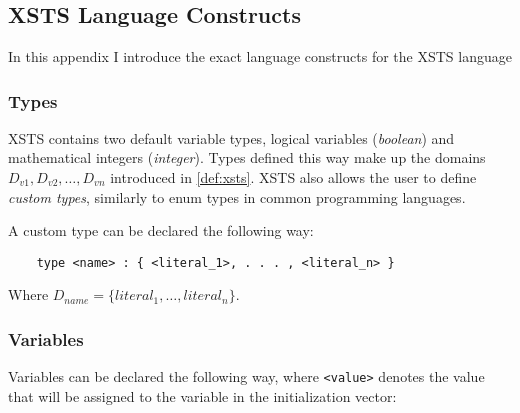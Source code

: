 \appendix
\chapter*{\fuggelek}
\setcounter{chapter}{\appendixnumber}

\section{XSTS Language Constructs}\label{sec:xsts_language}

In this appendix I introduce the exact language constructs for the XSTS language 

\subsection{Types}

XSTS contains two default variable types, logical variables (\emph{boolean}) and mathematical integers (\emph{integer}). Types defined this way make up the domains \(D_{v1}, D_{v2}, \dots, D_{vn}\) introduced in \autoref{def:xsts}. XSTS also allows the user to define \emph{custom types}, similarly to enum types in common programming languages.

A custom type can be declared the following way:

\begin{Verbatim}
	type <name> : { <literal_1>, . . . , <literal_n> }
\end{Verbatim}

Where \(D_{name} = \{ literal_1, \dots, literal_n \}\).

\subsection{Variables}

Variables can be declared the following way, where \verb|<value>| denotes the value that will be assigned to the variable in the initialization vector:

